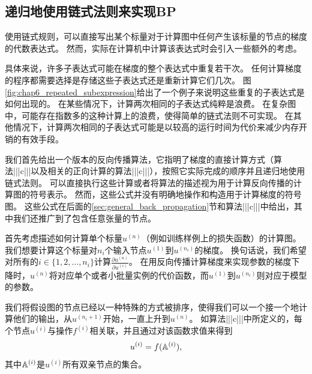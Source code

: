 \subsection{递归地使用链式法则来实现BP}
\label{sec:recursively_applying_the_chain_rule_to_obtain_backprop}

使用链式规则，可以直接写出某个标量对于计算图中任何产生该标量的节点的梯度的代数表达式。
然而，实际在计算机中计算该表达式时会引入一些额外的考虑。

具体来说，许多子表达式可能在梯度的整个表达式中重复若干次。
任何计算梯度的程序都需要选择是存储这些子表达式还是重新计算它们几次。
图\ref{fig:chap6_repeated_subexpression}给出了一个例子来说明这些重复的子表达式是如何出现的。
在某些情况下，计算两次相同的子表达式纯粹是浪费。
在复杂图中，可能存在指数多的这种计算上的浪费，使得简单的链式法则不可实现。
在其他情况下，计算两次相同的子表达式可能是以较高的运行时间为代价来减少内存开销的有效手段。

我们首先给出一个版本的反向传播算法，它指明了梯度的直接计算方式（算法|||c|||以及相关的正向计算的算法|||c|||），按照它实际完成的顺序并且递归地使用链式法则。
可以直接执行这些计算或者将算法的描述视为用于计算反向传播的计算图的符号表示。
然而，这些公式并没有明确地操作和构造用于计算梯度的符号图。
这些公式在后面的\ref{sec:general_back_propagation}节和算法|||c|||中给出，其中我们还推广到了包含任意张量的节点。

首先考虑描述如何计算单个标量$u^{(n)}$（例如训练样例上的损失函数）的计算图。
我们想要计算这个标量对$n_i$个输入节点$u^{(1)}$到$u^{(n_i)}$的梯度。
换句话说，我们希望对所有的$i\in\{1,2,\ldots,n_i\}$计算$\frac{\partial u^{(n)}}{\partial u^{(i)}}$。
在用反向传播计算梯度来实现参数的梯度下降时，$u^{(n)}$将对应单个或者小批量实例的代价函数，而$u^{(1)}$到$u^{(n_i)}$则对应于模型的参数。


我们将假设图的节点已经以一种特殊的方式被排序，使得我们可以一个接一个地计算他们的输出，从$u^{(n_i+1)}$开始，一直上升到$u^{(n)}$。
如算法|||c|||中所定义的，每个节点$u^{(i)}$与操作$f^{(i)}$相关联，并且通过对该函数求值来得到
\begin{equation}
  u^{(i)} = f(\mathbb{A}^{(i)}),
\end{equation}
其中$\mathbb{A}^{(i)}$是$u^{(i)}$所有双亲节点的集合。


